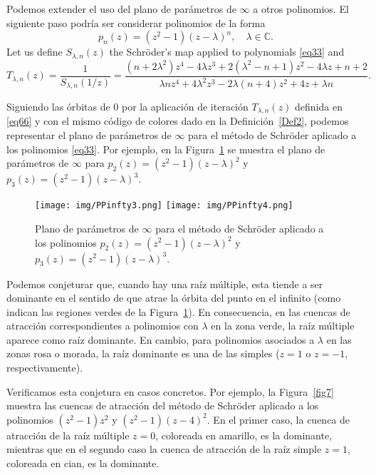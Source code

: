 \IfFileExists{aims.cls}{\documentclass{aims}}{\documentclass[11pt]{article}}
\numberwithin{equation}{section}
\newcommand{\includegraphics}[2][]{%
  }%
\renewcommand{\includegraphics}[2][]{%
  }%
\theoremstyle{thmstyleone}%
\theoremstyle{thmstyletwo}%
\theoremstyle{thmstylethree}%
\begin{document}
Podemos extender el uso del plano de parámetros de $\infty$ a otros polinomios. El siguiente paso podría ser considerar polinomios de la forma
\begin{equation}\label{eq33}
p_n(z)=(z^2-1)(z-\lambda)^n, \quad \lambda\in\mathbb{C}.
\end{equation}
Let us define $S_{\lambda,n}(z)$ the Schr\"oder's map applied to polynomials \eqref{eq33} and
\begin{equation}\label{eq66}
T_{\lambda,n}(z)=\frac{1}{S_{\lambda,n}(1/z)}=\frac{(n+2 \lambda ^2) z^4-4 \lambda  z^3+2( \lambda ^2- n+1) z^2-4 \lambda  z+n+2}
{\lambda  n z^4+4 \lambda ^2 z^3-2 \lambda  (n+4) z^2+4 z+\lambda n}.
\end{equation}

Siguiendo las órbitas de 0 por la aplicación de iteración $T_{\lambda,n}(z)$ definida en \eqref{eq66} y con el mismo código de colores dado en la Definición~\ref{Def2}, podemos representar el plano de parámetros de $\infty$ para el método de Schr\"oder aplicado a los polinomios \eqref{eq33}. Por ejemplo, en la Figura~\ref{fig6} se muestra el plano de parámetros de $\infty$ para $p_2(z)=(z^2-1)(z-\lambda)^2$ y $p_3(z)=(z^2-1)(z-\lambda)^3$.

\begin{figure}[h]%
\centering
\texttt{[image: img/PPinfty3.png]}\quad
\texttt{[image: img/PPinfty4.png]}
\caption{Plano de parámetros de $\infty$ para el método de Schr\"oder aplicado a los polinomios $p_2(z)=(z^2-1)(z-\lambda)^2$ y $p_3(z)=(z^2-1)(z-\lambda)^3$.}
\label{fig6}
\end{figure}

Podemos conjeturar que, cuando hay una raíz múltiple, esta tiende a ser dominante en el sentido de que atrae la órbita del punto en el infinito (como indican las regiones verdes de la Figura~\ref{fig6}). En consecuencia, en las cuencas de atracción correspondientes a polinomios con $\lambda$ en la zona verde, la raíz múltiple aparece como raíz dominante. En cambio, para polinomios asociados a $\lambda$ en las zonas rosa o morada, la raíz dominante es una de las simples ($z=1$ o $z=-1$, respectivamente).

Verificamos esta conjetura en casos concretos. Por ejemplo, la Figura~\ref{fig7} muestra las cuencas de atracción del método de Schröder aplicado a los polinomios $(z^2-1)z^2$ y $(z^2-1)(z-4)^2$. En el primer caso, la cuenca de atracción de la raíz múltiple $z=0$, coloreada en amarillo, es la dominante, mientras que en el segundo caso la cuenca de atracción de la raíz simple $z=1$, coloreada en cian, es la dominante.
\end{document}
